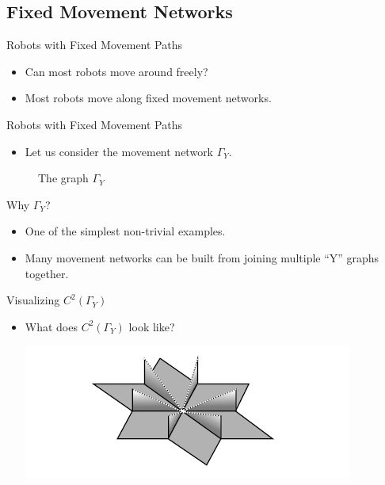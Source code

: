 \documentclass{beamer}
\newcommand{\Y}{\Gamma_Y}
\begin{document}
\subsection{Fixed Movement Networks}

\begin{frame}{Robots with Fixed Movement Paths}
\begin{itemize}
\item Can most robots move around freely?\pause
\item Most robots move along fixed movement networks.
\end{itemize}
\end{frame}

\begin{frame}{Robots with Fixed Movement Paths}
\begin{itemize}
\item Let us consider the movement network $\Y$.
\end{itemize}
\begin{figure}[h]
\caption{The graph $\Y$}
\centering
{}
\label{fig:maze}
\end{figure}
\end{frame}

\begin{frame}{Why $\Y$?}
\begin{itemize}
\item One of the simplest non-trivial examples.
\item Many movement networks can be built from joining multiple ``Y'' graphs together. 
\end{itemize}
\end{frame}

\begin{frame}{Visualizing $C^2(\Y)$}
\begin{itemize}
\item What does $C^2(\Y)$ look like? \pause


\centering
\includegraphics[scale=.75]{Config.jpg}
\end{itemize}
\end{frame}
\end{document}
